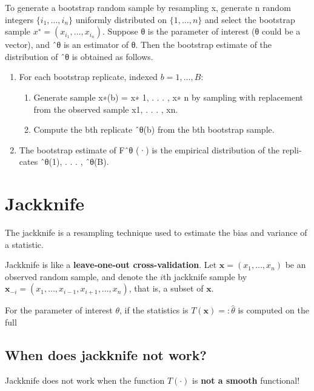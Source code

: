 \documentclass[
  letterpaper,
  DIV=11,
  numbers=noendperiod]{scrreprt}
\providecommand{\tightlist}{%
  \setlength{\itemsep}{0pt}\setlength{\parskip}{0pt}}
\begin{document}
To generate a bootstrap random sample by resampling x, generate n random
integers \(\{i_1,\dots, i_n\}\) uniformly distributed on
\(\{1,\dots , n\}\) and select the bootstrap sample
\(x^∗ = (x_{i_1} ,\dots, x_{i_n} )\). Suppose θ is the parameter of
interest (θ could be a vector), and ˆθ is an estimator of θ. Then the
bootstrap estimate of the distribution of ˆθ is obtained as follows.

\begin{enumerate}
\def\labelenumi{\arabic{enumi}.}
\tightlist
\item
  For each bootstrap replicate, indexed \(b = 1, \dots, B\):

  \begin{enumerate}
  \def\labelenumii{(\alph{enumii})}
  \tightlist
  \item
    Generate sample x∗(b) = x∗ 1, . . . , x∗ n by sampling with
    replacement from the observed sample x1, . . . , xn.
  \item
    Compute the bth replicate ˆθ(b) from the bth bootstrap sample.
  \end{enumerate}
\item
  The bootstrap estimate of Fˆθ (·) is the empirical distribution of the
  repli- cates ˆθ(1), . . . , ˆθ(B).
\end{enumerate}

\section{Jackknife}\label{jackknife}

The jackknife is a resampling technique used to estimate the bias and
variance of a statistic.

Jackknife is like a \textbf{leave-one-out cross-validation}. Let
\(\mathbf{x}= (x_1,\dots,x_n)\) be an observed random sample, and denote
the \(i\)th jackknife sample by
\(\mathbf{x}_{-i} = (x_1,\dots,x_{i-1},x_{i+1},\dots,x_n)\), that is, a
subset of \(\mathbf{x}\).

For the parameter of interest \(\theta\), if the statistics is
\(T(\mathbf{x})=:\hat{\theta}\) is computed on the full

\subsection{When does jackknife not
work?}\label{when-does-jackknife-not-work}

Jackknife does not work when the function \(T(\cdot)\) is \textbf{not a
smooth} functional!
\end{document}

